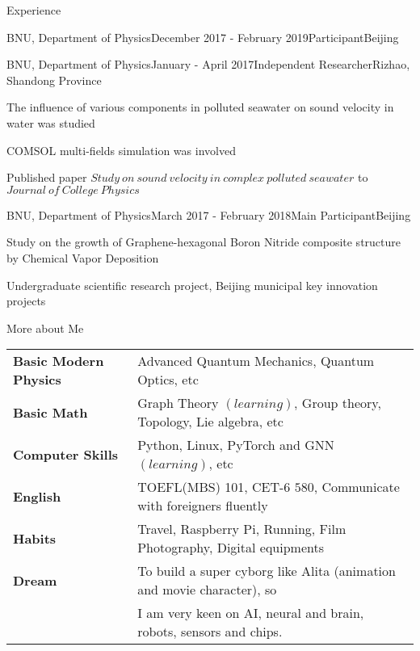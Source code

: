 \documentclass{resume} %
\begin{document}
\begin{sloppypar}
\begin{rSection}{Experience}
\begin{rSubsection}{BNU, Department of Physics}{December 2017 - February 2019}{Participant}{Beijing}
\end{rSubsection}


\begin{rSubsection}{BNU, Department of Physics}{January - April 2017}{Independent Researcher}{Rizhao, Shandong Province}
\item The influence of various components in polluted seawater on sound velocity in water was studied
\item COMSOL multi-fields simulation was involved
\item Published paper $Study \ on \ sound \ velocity \ in \ complex \ polluted \ seawater$ to $Journal \ of \ College \ Physics$

\end{rSubsection}


\begin{rSubsection}{BNU, Department of Physics}{March 2017 - February 2018}{Main Participant}{Beijing}
\item Study on the growth of Graphene-hexagonal Boron Nitride composite structure by Chemical Vapor Deposition
\item Undergraduate scientific research project, Beijing municipal key innovation projects
\end{rSubsection}

\end{rSection}

\begin{rSection}{More about Me}

\begin{tabular}{ @{} >{\bfseries}l @{\hspace{6ex}} l }
Basic Modern Physics & Advanced Quantum Mechanics, Quantum Optics, etc \\
Basic Math & Graph Theory $(learning)$, Group theory, Topology, Lie algebra, etc \\
Computer Skills & Python, Linux, PyTorch and GNN $(learning)$, etc \\
English & TOEFL(MBS) 101, CET-6 $580$, Communicate with foreigners fluently \\
Habits & Travel, Raspberry Pi, Running, Film Photography, Digital equipments \\
Dream & To build a super cyborg like Alita (animation and movie character), so \\
 &  I am very keen on AI, neural and brain, robots, sensors and chips. 



\end{tabular}
\end{rSection}
\end{sloppypar}
\end{document}
